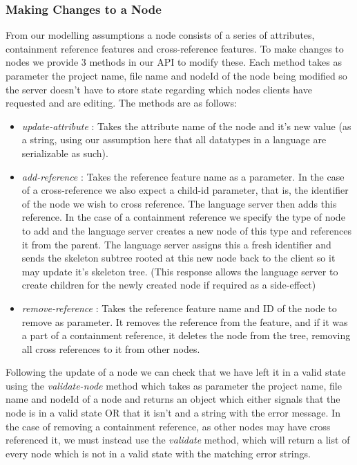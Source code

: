 \documentclass{article}
\begin{document}
{\subsubsection{Making Changes to a Node}

From our modelling assumptions a node consists of a series of attributes, containment reference features and cross-reference features. To make changes to nodes we provide 3 methods in our API to modify these. Each method takes as parameter the project name, file name and nodeId of the node being modified so the server doesn't have to store state regarding which nodes clients have requested and are editing. The methods are as follows: 
\begin{itemize}
\item \emph{update-attribute} : Takes the attribute name  of the node and it's new value (as a string, using our assumption here that all datatypes in a language are serializable as such). 
\item \emph{add-reference} : Takes the reference feature name as a parameter. In the case of a cross-reference we also expect a child-id parameter, that is, the identifier of the node we wish to cross reference. The language server then adds this reference. In the case of a containment reference we specify the type of node to add and the language server creates a new node of this type and references it from the parent. The language server assigns this a fresh identifier and sends the skeleton subtree rooted at this new node back to the client so it may update it's skeleton tree. (This response allows the language server to create children for the newly created node if required as a side-effect)
\item \emph{remove-reference} : Takes the reference feature name and ID of the node to remove as parameter. It removes the reference from the feature, and if it was a part of a containment reference, it deletes the node from the tree, removing all cross references to it from other nodes.
\end{itemize} 
Following the update of a node we can check that we have left it in a valid state using the \emph{validate-node} method which takes as parameter the project name, file name and nodeId of a node and returns an object which either signals that the node is in a valid state OR that it isn't and a string with the error message. In the case of removing a containment reference, as other nodes may have cross referenced it, we must instead use the \emph{validate} method, which will return a list of every node which is not in a valid state with the matching error strings.

}
\end{document}
